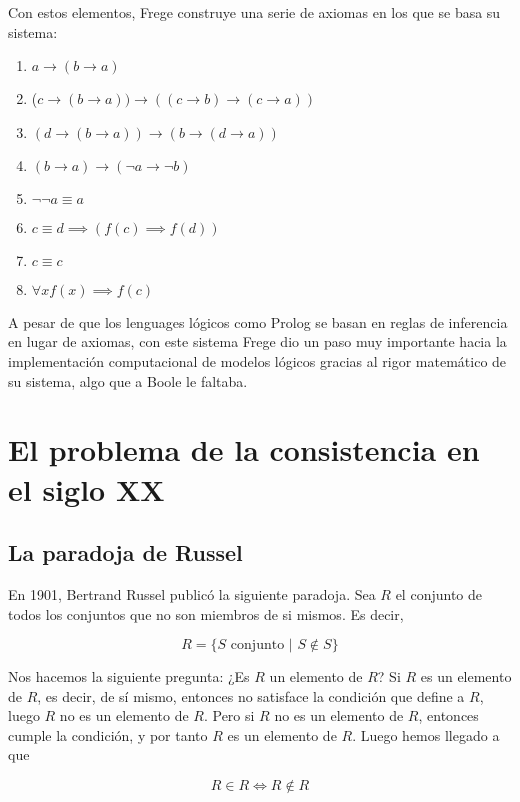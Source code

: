 \documentclass{article}
\begin{document}
Con estos elementos, Frege construye una serie de axiomas en los que se basa su sistema\cite{sullivan2004frege}:

\begin{enumerate}
    \item $a \rightarrow (b \rightarrow a)$
    \item ($c \rightarrow (b \rightarrow a)) \rightarrow ((c \rightarrow b) \rightarrow (c \rightarrow a))$
    \item $(d \rightarrow (b \rightarrow a)) \rightarrow (b \rightarrow (d \rightarrow a))$
    \item $(b \rightarrow a) \rightarrow (\lnot a \rightarrow \lnot b)$
    \item $\lnot \lnot a \equiv a$
    \item $c \equiv d \implies (f(c) \implies f(d))$
    \item $c \equiv c$
    \item $\forall x f(x) \implies f(c)$
\end{enumerate}

A pesar de que los lenguages lógicos como Prolog se basan en reglas de inferencia en lugar de axiomas, con este sistema Frege dio un paso muy importante hacia la implementación computacional de modelos lógicos gracias al rigor matemático de su sistema, algo que a Boole le faltaba.

\section{El problema de la consistencia en el siglo XX}

\subsection{La paradoja de Russel}

En 1901, Bertrand Russel publicó la siguiente paradoja. Sea $R$ el conjunto de todos los conjuntos que no son miembros de si mismos. Es decir,

$$
    R = \{S \,\, \text{conjunto} \,\, | \,\, S \notin S\}
$$

Nos hacemos la siguiente pregunta: ¿Es $R$ un elemento de $R$? Si $R$ es un elemento de $R$, es decir, de sí mismo, entonces no satisface la condición que define a $R$, luego $R$ no es un elemento de $R$. Pero si $R$ no es un elemento de $R$, entonces cumple la condición, y por tanto $R$ es un elemento de $R$. Luego hemos llegado a que

$$
    R \in R \iff R \notin R
$$
\end{document}

